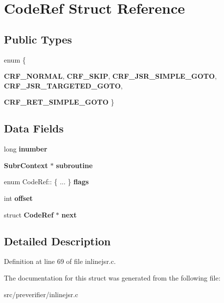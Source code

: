 \section{CodeRef Struct Reference}
\label{struct_code_ref}
\subsection*{Public Types}
\begin{DoxyCompactItemize}
\item 
enum \{ \par
{\bfseries CRF\_\-NORMAL}, 
{\bfseries CRF\_\-SKIP}, 
{\bfseries CRF\_\-JSR\_\-SIMPLE\_\-GOTO}, 
{\bfseries CRF\_\-JSR\_\-TARGETED\_\-GOTO}, 
\par
{\bfseries CRF\_\-RET\_\-SIMPLE\_\-GOTO}
 \}
\end{DoxyCompactItemize}
\subsection*{Data Fields}
\begin{DoxyCompactItemize}
\item 
long {\bfseries inumber}\label{struct_code_ref_ae36f6e864e71d63c49ce3727d15a533e}

\item 
{\bf SubrContext} $\ast$ {\bfseries subroutine}\label{struct_code_ref_a601aaccf4f5800f718120e086fdac674}

\item 
enum CodeRef:: \{ ... \}  {\bfseries flags}\label{struct_code_ref_aefa33a5f7550a6d08cfbf2060ec97bd3}

\item 
int {\bfseries offset}\label{struct_code_ref_ac86cb7aafe0ef700885e48867c61600c}

\item 
struct {\bf CodeRef} $\ast$ {\bfseries next}\label{struct_code_ref_a4fbe131619c1fb089e67f01146133368}

\end{DoxyCompactItemize}


\subsection{Detailed Description}


Definition at line 69 of file inlinejsr.c.



The documentation for this struct was generated from the following file:\begin{DoxyCompactItemize}
\item 
src/preverifier/inlinejsr.c\end{DoxyCompactItemize}
